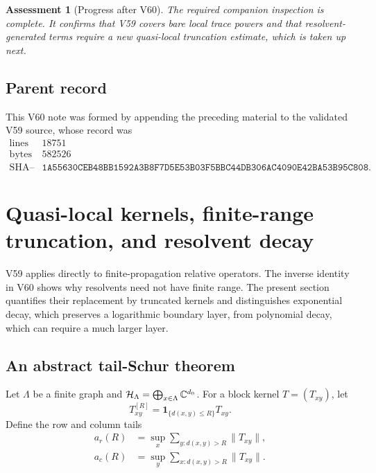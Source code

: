\documentclass[11pt]{article}
\newtheorem{assessment}[theorem]{Assessment}
\begin{document}
\begin{assessment}[Progress after V60]
\label{ass:v11v60-status}
The required companion inspection is complete.  It confirms that V59
covers bare local trace powers and that resolvent-generated terms
require a new quasi-local truncation estimate, which is taken up next.
\end{assessment}

\subsection{Parent record}

This V60 note was formed by appending the preceding material to the
validated V59 source, whose record was
\[
\begin{array}{c|c}
\text{lines}&18751\\
\text{bytes}&582526\\
\text{SHA--256}&
\texttt{1A55630CEB48BB1592A3B8F7D5E53B03F5BBC44DB306AC4090E42BA53B95C808}.
\end{array}                                                     \tag{60.3}
\]


\section{Quasi-local kernels, finite-range truncation, and resolvent
decay}
\label{sec:v11v61}

V59 applies directly to finite-propagation relative operators.  The
inverse identity in V60 shows why resolvents need not have finite
range.  The present section quantifies their replacement by truncated
kernels and distinguishes exponential decay, which preserves a
logarithmic boundary layer, from polynomial decay, which can require a
much larger layer.

\subsection{An abstract tail-Schur theorem}

Let \(\Lambda\) be a finite graph and
\({\cal H}_\Lambda=\bigoplus_{x\in\Lambda}\mathbb C^{d_0}\).
For a block kernel \(T=(T_{xy})\), let
\[
                 T^{[R]}_{xy}=\mathbf1_{\{d(x,y)\le R\}}T_{xy}.
                                                                  \tag{61.1}
\]
Define the row and column tails
\[
\begin{split}
 a_r(R)&=\sup_x\sum_{y:d(x,y)>R}\lVert T_{xy}\rVert,\\
 a_c(R)&=\sup_y\sum_{x:d(x,y)>R}\lVert T_{xy}\rVert.           \tag{61.2}
\end{split}
\]
\end{document}
